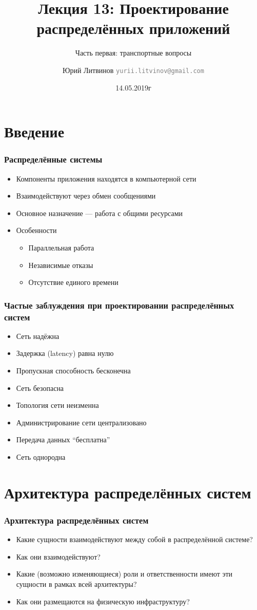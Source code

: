 \documentclass[xetex,mathserif,serif]{beamer}
\title{Лекция 13: Проектирование распределённых приложений}
\subtitle{Часть первая: транспортные вопросы}
\author[Юрий Литвинов]{Юрий Литвинов \newline \textcolor{gray}{\small\texttt{yurii.litvinov@gmail.com}}}
\date{14.05.2019г}
\begin{document}
	
	\frame{\titlepage}

	\section{Введение}

	\begin{frame}
		\frametitle{Распределённые системы}
		\begin{itemize}
			\item Компоненты приложения находятся в компьютерной сети
			\item Взаимодействуют через обмен сообщениями
			\item Основное назначение --- работа с общими ресурсами
			\item Особенности
			\begin{itemize}
				\item Параллельная работа
				\item Независимые отказы
				\item Отсутствие единого времени
			\end{itemize}
		\end{itemize}
	\end{frame}

	\begin{frame}
		\frametitle{Частые заблуждения при проектировании распределённых систем}
		\begin{itemize}
			\item Сеть надёжна
			\item Задержка (latency) равна нулю
			\item Пропускная способность бесконечна
			\item Сеть безопасна
			\item Топология сети неизменна
			\item Администрирование сети централизовано
			\item Передача данных ``бесплатна''
			\item Сеть однородна
		\end{itemize}
	\end{frame}

	\section{Архитектура распределённых систем}

	\begin{frame}
		\frametitle{Архитектура распределённых систем}
		\begin{itemize}
			\item Какие сущности взаимодействуют между собой в распределённой системе?
			\item Как они взаимодействуют?
			\item Какие (возможно изменяющиеся) роли и ответственности имеют эти сущности в рамках всей архитектуры?
			\item Как они размещаются на физическую инфраструктуру?
		\end{itemize}
	\end{frame}
\end{document}
